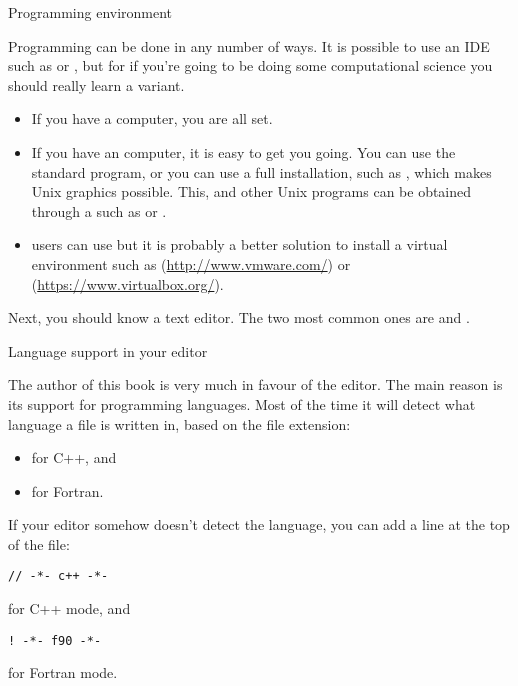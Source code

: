 
 {Programming environment}

Programming can be done in any number of ways. It is possible to use an
\ac{IDE} such as  or , but
for if you're going to be doing some computational science
you should really learn a  variant.
\begin{itemize}
\item If you have a  computer, you are all set.
\item If you have an  computer, it is easy to get you
  going. You can use the standard  program, or you can use a
  full  installation, such as
  , which makes Unix graphics possible.
  This, and other Unix programs can be obtained
  through  a  such as  or .
\item {} users can use
   but it is probably a better solution to install a
  virtual environment such as 
  (\url{http://www.vmware.com/}) or
   (\url{https://www.virtualbox.org/}).
\end{itemize}

Next, you should know a text editor. The two most common ones are
 and .

 {Language support in your editor}
\label{sec:editor-mode}

The author of this book is very much in favour of the
 editor. The main reason is its support for
programming languages. Most of the time it will detect what language a
file is written in, based on the file extension:
\begin{itemize}
\item {} for C++, and
\item {} for Fortran.
\end{itemize}
If your editor somehow doesn't detect the language, you can add a line
at the top of the file:
\begin{verbatim}
// -*- c++ -*-
\end{verbatim}
for C++ mode, and 
\begin{verbatim}
! -*- f90 -*-
\end{verbatim}
for Fortran mode.

